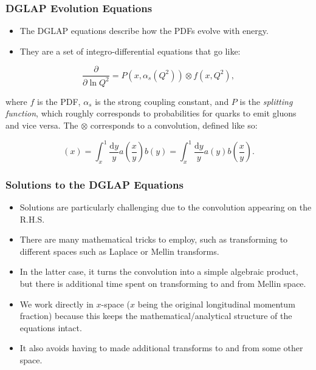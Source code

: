 \documentclass{beamer}
\newcommand{\dd}{\mathrm{d}}
\begin{document}
\begin{frame}
  \frametitle{DGLAP Evolution Equations}

  \begin{itemize}
  \item The DGLAP equations describe how the PDFs evolve with energy.
  \item They are a set of integro-differential equations that go like:
  \end{itemize}

  \begin{equation}
    \frac{\partial}{\partial \ln Q^2} = P(x, \alpha_s(Q^2)) \otimes f(x, Q^2),
  \end{equation}

  where $f$ is the PDF, $\alpha_s$ is the strong coupling constant, and $P$ is the \textit{splitting function}, which roughly corresponds to probabilities for quarks to emit gluons and vice versa. The $\otimes$ corresponds to a convolution, defined like so:

  \begin{equation}
    [a \otimes b](x) = \int_x^1 \frac{\dd y}{y} a\left( \frac{x}{y} \right) b(y) = \int_x^1 \frac{\dd y}{y} a(y) b\left( \frac{x}{y} \right).
  \end{equation}

\end{frame}


\begin{frame}
  \frametitle{Solutions to the DGLAP Equations}

  \begin{itemize}
  \item Solutions are particularly challenging due to the convolution appearing on the R.H.S.
  \item There are many mathematical tricks to employ, such as transforming to different spaces such as Laplace or Mellin transforms.
  \item In the latter case, it turns the convolution into a simple algebraic product, but there is additional time spent on transforming to and from Mellin space.
  \end{itemize}

  \begin{itemize}
  \item We work directly in $x$-space ($x$ being the original longitudinal momentum fraction) because this keeps the mathematical/analytical structure of the equations intact.
  \item It also avoids having to made additional transforms to and from some other space.
  \end{itemize}
\end{frame}
  
\end{document}
